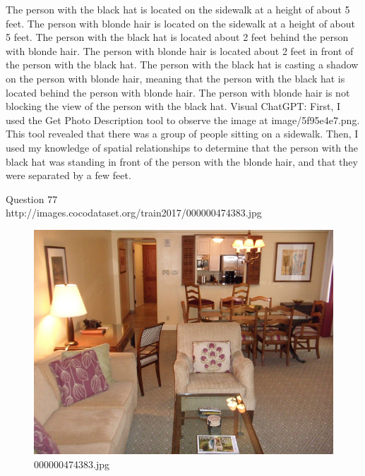 \begin{enumerate}
    The person with the black hat is located on the sidewalk at a height of about 5 feet.
    The person with blonde hair is located on the sidewalk at a height of about 5 feet.
    The person with the black hat is located about 2 feet behind the person with blonde hair.
    The person with blonde hair is located about 2 feet in front of the person with the black hat.
    The person with the black hat is casting a shadow on the person with blonde hair, meaning that the person with the black hat is located behind the person with blonde hair.
    The person with blonde hair is not blocking the view of the person with the black hat.
    \subitem Visual ChatGPT: 
    First, I used the Get Photo Description tool to observe the image at image/5f95e4e7.png. This tool revealed that there was a group of people sitting on a sidewalk. Then, I used my knowledge of spatial relationships to determine that the person with the black hat was standing in front of the person with the blonde hair, and that they were separated by a few feet.
\end{enumerate}
Question 77\\
http://images.cocodataset.org/train2017/000000474383.jpg
\begin{figure}[h]
    \centering
    \includegraphics[width=0.8\linewidth]{../image set/hard/000000474383.jpg}
    \caption{000000474383.jpg}
\end{figure}
